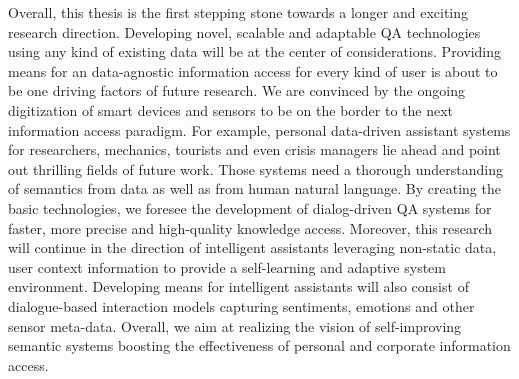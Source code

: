 Overall, this thesis is the first stepping stone towards a longer and exciting research direction. 
Developing novel, scalable and adaptable \ac{QA} technologies using any kind of existing data will be at the center of considerations.
Providing means for an data-agnostic information access for every kind of user is about to be one driving factors of future research. 
We are convinced by the ongoing digitization of smart devices and sensors to be on the border to the next information access paradigm.  
For example, personal data-driven assistant systems for researchers, mechanics, tourists and even crisis managers lie  ahead and point out thrilling fields of future work.
Those systems need a thorough understanding of semantics from data as well as from human natural language. 
By creating the basic technologies, we foresee the development of dialog-driven \ac{QA} systems for faster, more precise and high-quality knowledge access.
Moreover, this research will continue in the direction of intelligent assistants leveraging non-static data, user context information to provide a self-learning and adaptive system environment.
Developing means for intelligent assistants will also consist of dialogue-based interaction models capturing sentiments, emotions and other sensor meta-data.
Overall, we aim at realizing the vision of self-improving semantic systems boosting the effectiveness of personal and corporate information access.